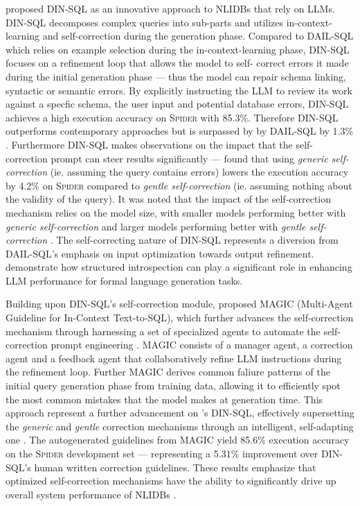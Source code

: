 \cite{DINSQL} proposed DIN-SQL as an innovative approach to NLIDBs that rely on LLMs. DIN-SQL decomposes complex queries into
sub-parts and utilizes in-context-learning and self-correction during the generation phase. Compared to DAIL-SQL which relies
on example selection during the in-context-learning phase, DIN-SQL focuses on a refinement loop that allows the model to self-
correct errors it made during the initial generation phase — thus the model can repair schema linking, syntactic or semantic
errors. By explicitly instructing the LLM to review its work against a specfic schema, the user input and potential database
errors, DIN-SQL achieves a high execution accuracy on \textsc{Spider} with 85.3\%. Therefore DIN-SQL outperforms contemporary
approaches but is surpassed by by DAIL-SQL by 1.3\% \citep{DINSQL, DAIL-SQL}. Furthermore DIN-SQL makes observations on the
impact that the self-correction prompt can steer results significantly — \citeauthor{DINSQL} found that using \textit{generic
self-correction} (ie. assuming the query contains errors) lowers the execution accuracy by 4.2\% on \textsc{Spider} compared to
\textit{gentle self-correction} (ie. assuming nothing about the validity of the query). It was noted that the impact of the
self-correction mechanism relies on the model size, with smaller models performing better with \textit{generic self-correction}
and larger models performing better with \textit{gentle self-correction} \citep{DINSQL}. The self-correcting nature of DIN-SQL
represents a diversion from DAIL-SQL's emphasis on input optimization towards output refinement. \citeauthor{DINSQL} demonstrate
how structured introspection can play a significant role in enhancing LLM performance for formal language generation tasks.

Building upon DIN-SQL's self-correction module, \cite{MAGIC} proposed MAGIC (Multi-Agent Guideline for In-Context Text-to-SQL),
which further advances the self-correction mechanism through harnessing a set of specialized agents to automate the self-correction
prompt engineering \citep{MAGIC}. MAGIC consists of a manager agent, a correction agent and a feedback agent that collaboratively
refine LLM instructions during the refinement loop. Further MAGIC derives common faliure patterns of the initial query generation
phase from training data, allowing it to efficiently spot the most common mistakes that the model makes at generation time. This
approach represent a further advancement on \citeauthor{DINSQL}'s DIN-SQL, effectively supersetting the \textit{generic} and
\textit{gentle} correction mechanisms through an intelligent, self-adapting one \citep{MAGIC}. The autogenerated guidelines from
MAGIC yield 85.6\% execution accuracy on the \textsc{Spider} development set — representing a 5.31\% improvement over DIN-SQL's
human written correction guidelines. These results emphasize that optimized self-correction mechanisms have the ability to
significantly drive up overall system performance of NLIDBs \citep{MAGIC}.

